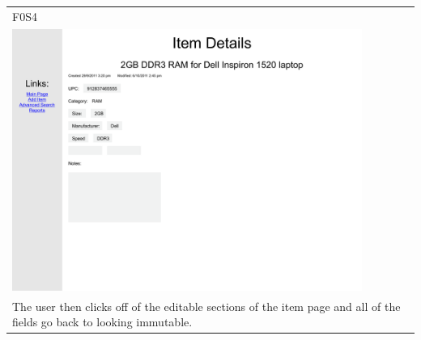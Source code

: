 \documentclass{article}
\begin{document}
~\\
~\\
\begin{tabular}{ p{4.5in} }
F0S4\\
\includegraphics[keepaspectratio, width=4.5in]{modifyDetailsF0S4.pdf} \\
The user then clicks off of the editable sections of the item page and all of the fields go back to looking immutable.
\end{tabular}
\end{document}
